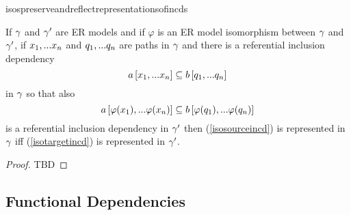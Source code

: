isospreserveandreflectrepresentationsofincds
\begin{lemma}
\label{isospreserveandreflectrepresentationsofincds}
If $\gamma$ and $\gamma'$ are ER models and  if  $\varphi$ is an ER model isomorphism between $\gamma$  and $\gamma'$,  
if $x_1,...x_n$ and $q_1,...q_n$ are paths in 
$\gamma$
and there is a referential  inclusion dependency
\begin{equation}
\label{isosourceincd}
a\left[x_1,...x_n\right]\subseteq b\left[q_1,...q_n\right]
\end{equation}
 in $\gamma$ 
so that also 
\begin{equation}
\label{isotargetincd}
a\left[\varphi(x_1),...\varphi(x_n)\right]\subseteq b\left[\varphi(q_1),...\varphi(q_n)\right]
\end{equation}
is a referential inclusion dependency in $\gamma'$
then (\ref{isosourceincd}) is represented in $\gamma$ 
iff (\ref{isotargetincd}) is represented in $\gamma'$.
\end{lemma}
\begin{proof}
TBD
\end{proof}


\subsection{Functional Dependencies}

